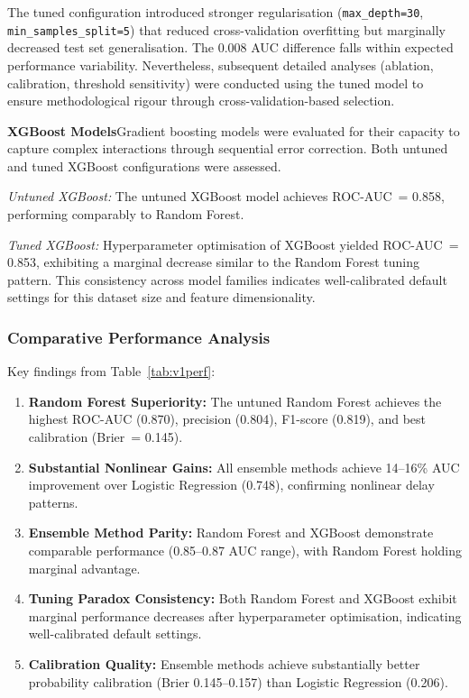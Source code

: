 \documentclass{report}
\begin{document}
The tuned configuration introduced stronger regularisation
(\texttt{max\_depth=30}, \texttt{min\_samples\_split=5}) that reduced
cross-validation overfitting but marginally decreased test set
generalisation.  The 0.008 AUC difference falls within expected performance
variability.  Nevertheless, subsequent detailed analyses (ablation,
calibration, threshold sensitivity) were conducted using the tuned model to
ensure methodological rigour through cross-validation-based selection.

\textbf{XGBoost Models}\quad Gradient boosting models were evaluated for
their capacity to capture complex interactions through sequential error
correction.  Both untuned and tuned XGBoost configurations were assessed.

\textit{Untuned XGBoost:} The untuned XGBoost model achieves
ROC-AUC~= 0.858, performing comparably to Random Forest.

\textit{Tuned XGBoost:} Hyperparameter optimisation of XGBoost yielded
ROC-AUC~= 0.853, exhibiting a marginal decrease similar to the Random Forest
tuning pattern.  This consistency across model families indicates
well-calibrated default settings for this dataset size and feature
dimensionality.

\subsubsection*{Comparative Performance Analysis}

Key findings from Table~\ref{tab:v1perf}:

\begin{enumerate}
\item \textbf{Random Forest Superiority:} The untuned Random Forest achieves
  the highest ROC-AUC (0.870), precision (0.804), F1-score (0.819), and best
  calibration (Brier~= 0.145).
\item \textbf{Substantial Nonlinear Gains:} All ensemble methods achieve
  14--16\% AUC improvement over Logistic Regression (0.748), confirming
  nonlinear delay patterns.
\item \textbf{Ensemble Method Parity:} Random Forest and XGBoost demonstrate
  comparable performance (0.85--0.87 AUC range), with Random Forest holding
  marginal advantage.
\item \textbf{Tuning Paradox Consistency:} Both Random Forest and XGBoost
  exhibit marginal performance decreases after hyperparameter optimisation,
  indicating well-calibrated default settings.
\item \textbf{Calibration Quality:} Ensemble methods achieve substantially
  better probability calibration (Brier 0.145--0.157) than Logistic
  Regression (0.206).
\end{enumerate}
\end{document}
